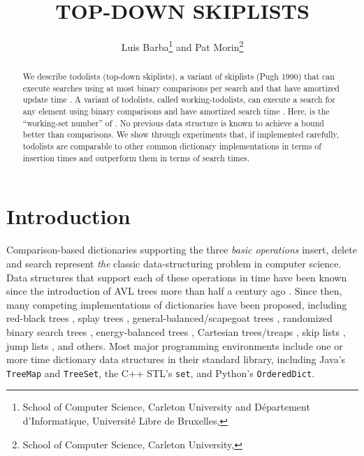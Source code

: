\documentclass{patmorin}
\title{\MakeUppercase{Top-Down Skiplists}}
\author{Luis Barba\thanks{School of Computer Science, Carleton University
             and Département d'Informatique, 
             Université Libre de Bruxelles,
             \email{lbarbafl@ulb.ac.be}}\enspace
     and Pat Morin\thanks{School of Computer Science, Carleton University,
             \email{morin@scs.carleton.ca}}}
\begin{document}
\begin{titlepage}
\maketitle

\begin{abstract}
  We describe todolists (top-down skiplists), a variant of skiplists
  (Pugh 1990) that can execute searches using at most  binary comparisons per search and that have amortized update time
  . A variant of todolists, called working-todolists,
  can execute a search for any element  using  binary comparisons and have amortized search time
  . Here,  is the ``working-set number'' of
  . No previous data structure is known to achieve a bound better
  than  comparisons. We show through experiments that,
  if implemented carefully, todolists are comparable to other common
  dictionary implementations in terms of insertion times and outperform
  them in terms of search times.
\end{abstract}

\end{titlepage}

\section{Introduction}

Comparison-based dictionaries supporting the three \emph{basic
operations} insert, delete and search represent \emph{the} classic
data-structuring problem in computer science.  Data structures that
support each of these operations in  time have been known
since the introduction of AVL trees more than half a century ago
\cite{adelson-velskii.landis:algorithm}.  Since then, many competing
implementations of dictionaries have been proposed, including
red-black trees \cite{guibas.sedgewick:dichromatic}, splay trees
\cite{sleator.tarjan:self-adjusting}, general-balanced/scapegoat
trees \cite{andersson:general,galperin.rivest:scapegoat},
randomized binary search trees \cite{martinez:randomized},
energy-balanced trees \cite{goodrich:competitive}, Cartesian trees/treaps
\cite{aragon.seidel:randomized,vuillemin:unifying}, skip lists
\cite{pugh:skip}, jump lists \cite{bronnimann.cazals.ea:randomized},
and others.  Most major programming environments include one or more
 time dictionary data structures in their standard library,
including Java's \texttt{TreeMap} and \texttt{TreeSet}, the C++ STL's
\texttt{set}, and Python's \texttt{OrderedDict}.
\end{document}
